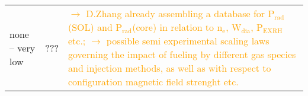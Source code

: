 \documentclass[%
    a4,
    10pt,
    twoside
    ]{%
    scrreprt%
    }
\newcommand{\ix}[1]{_\text{#1}}
\begin{document}
\begin{table}[h!]
\begin{tabular}{l|c|p{}}
                none -- very low & %
                ??? & %
                \textcolor{orange}{%
                  $\rightarrow$ D.Zhang already assembling a database for P$\ix{rad}$(SOL) and P$\ix{rad}$(core) in relation to n$\ix{e}$, W$\ix{dia}$, P$\ix{EXRH}$ etc.;%
                }\newline%
                \textcolor{orange}{%
                  $\rightarrow$ possible semi experimental scaling laws governing the impact of fueling by different gas species and injection methods, as well as with respect to configuration magnetic field strenght etc.%
                }%

            \end{tabular}%
        \end{table}%
\end{document}
